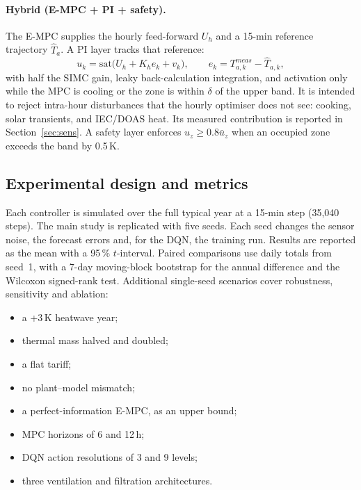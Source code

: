 \paragraph{Hybrid (E-MPC + PI + safety).}
The E-MPC supplies the hourly feed-forward $U_h$ and a 15-min reference trajectory
$\hat T_a$. A PI layer tracks that reference:
\begin{equation}
u_k = \mathrm{sat}\big(U_h + K_h e_k + v_k\big),\qquad e_k = T_{a,k}^{meas}-\hat T_{a,k},
\end{equation}
with half the SIMC gain, leaky back-calculation integration, and activation only while
the MPC is cooling or the zone is within $\delta$ of the upper band. It is intended to reject
intra-hour disturbances that the hourly optimiser does not see: cooking, solar
transients, and IEC/DOAS heat. Its measured contribution is reported in
Section~\ref{sec:sens}. A safety layer enforces $u_z\ge0.8\bar u_z$ when an
occupied zone exceeds the band by 0.5\,K.

\subsection{Experimental design and metrics}
Each controller is simulated over the full typical year at a 15-min step (35{,}040 steps).
The main study is replicated with five seeds. Each seed changes the sensor noise, the
forecast errors and, for the DQN, the training run. Results are reported as the mean
with a 95\,\% $t$-interval. Paired comparisons use daily totals from seed~1, with a
7-day moving-block bootstrap for the annual difference and the Wilcoxon signed-rank
test. Additional single-seed scenarios cover robustness, sensitivity and ablation:
\begin{itemize}
  \item a +3\,K heatwave year;
  \item thermal mass halved and doubled;
  \item a flat tariff;
  \item no plant--model mismatch;
  \item a perfect-information E-MPC, as an upper bound;
  \item MPC horizons of 6 and 12\,h;
  \item DQN action resolutions of 3 and 9 levels;
  \item three ventilation and filtration architectures.
\end{itemize}

